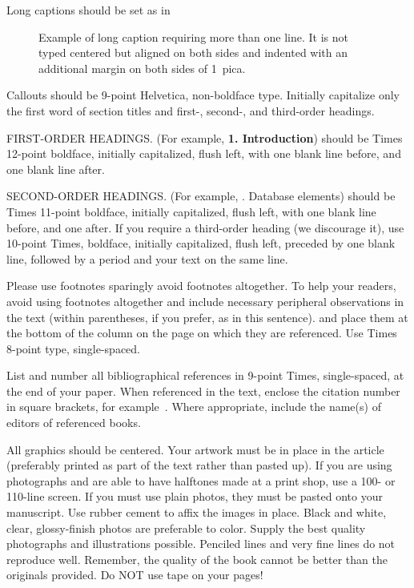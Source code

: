 \documentclass[times, 10pt,twocolumn]{article}
\begin{document}
\noindent Long captions should be set as in \begin{figure}[h]
	\caption{Example of long caption requiring more than one line. It is not
	typed centered but aligned on both sides and indented with an additional
margin on both sides of 1~pica.} \end{figure}

\noindent Callouts should be 9-point Helvetica, non-boldface type.
Initially capitalize only the first word of section titles and first-,
second-, and third-order headings.

FIRST-ORDER HEADINGS. (For example, {\large \bf 1.  Introduction}) should
be Times 12-point boldface, initially capitalized, flush left, with one
blank line before, and one blank line after.

SECOND-ORDER HEADINGS. (For example, {. Database elements})
should be Times 11-point boldface, initially capitalized, flush left, with
one blank line before, and one after. If you require a third-order heading
(we discourage it), use 10-point Times, boldface, initially capitalized,
flush left, preceded by one blank line, followed by a period and your text
on the same line.


Please use footnotes sparingly%
	avoid footnotes altogether.  To help your readers, avoid using footnotes
	altogether and include necessary peripheral observations in the text
	(within parentheses, if you prefer, as in this sentence). and place them
	at the bottom of the column on the page on which they are referenced.
	Use Times 8-point type, single-spaced.



List and number all bibliographical references in 9-point Times,
single-spaced, at the end of your paper. When referenced in the text,
enclose the citation number in square brackets, for example~\cite{ex1}.
Where appropriate, include the name(s) of editors of referenced books.


All graphics should be centered. Your artwork must be in place in the
article (preferably printed as part of the text rather than pasted up).
If you are using photographs and are able to have halftones made at a
print shop, use a 100- or 110-line screen. If you must use plain photos,
they must be pasted onto your manuscript. Use rubber cement to affix the
images in place. Black and white, clear, glossy-finish photos are
preferable to color. Supply the best quality photographs and illustrations
possible. Penciled lines and very fine lines do not reproduce well.
Remember, the quality of the book cannot be better than the originals
provided. Do NOT use tape on your pages!
\end{document}
